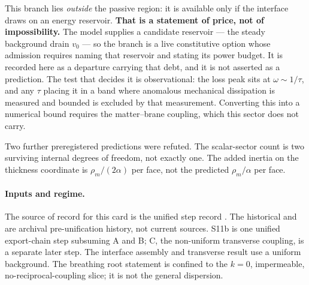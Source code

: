 This branch lies \emph{outside} the passive region: it is available only if the
interface draws on an energy reservoir. \textbf{That is a statement of price,
not of impossibility.} The model supplies a candidate reservoir --- the steady
background drain \(v_0\) --- so the branch is a live constitutive option whose
admission requires naming that reservoir and stating its power budget. It is
recorded here as a departure carrying that debt, and it is not asserted as a
prediction. The test that decides it is observational: the loss peak sits at
\(\omega\sim1/\tau\), and any \(\tau\) placing it in a band where anomalous
mechanical dissipation is measured and bounded is excluded by that measurement.
Converting this into a numerical bound requires the matter--brane coupling,
which this sector does not carry.

Two further preregistered predictions were refuted. The scalar-sector count is
two surviving internal degrees of freedom, not exactly one. The added inertia
on the thickness coordinate is \(\rho_m/(2\alpha)\) per face, not the predicted
\(\rho_m/\alpha\) per face.

\paragraph{Inputs and regime.}
The source of record for this card is the unified step record
.
The historical
 and
 are
archival pre-unification history, not current sources. S11b is one unified
export-chain step subsuming A and B; C, the non-uniform transverse coupling,
is a separate later step.
The interface assembly and transverse result use a uniform background. The
breathing root statement is confined to the \(k=0\), impermeable,
no-reciprocal-coupling slice; it is not the general dispersion.

